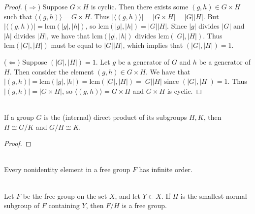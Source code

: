 \documentclass{article}
\begin{document}
\begin{proof}
    ($\Rightarrow$) Suppose $G \times H$ is cyclic. Then there exists some $(g, h) \in G \times H$ such that $\langle (g, h) \rangle = G \times H$. Thus $|\langle (g, h) \rangle| = |G \times H| = |G||H|$. But $|\langle (g, h) \rangle| = \mathrm{lcm}(|g|, |h|)$, so $\mathrm{lcm}(|g|, |h|) = |G||H|$. Since $|g|$ divides $|G|$ and $|h|$ divides $|H|$, we have that $\mathrm{lcm}(|g|, |h|)$ divides $\mathrm{lcm}(|G|, |H|)$. Thus $\mathrm{lcm}(|G|, |H|)$ must be equal to $|G||H|$, which implies that $(|G|, |H|) = 1$.

    ($\Leftarrow$) Suppose $(|G|, |H|) = 1$. Let $g$ be a generator of $G$ and $h$ be a generator of $H$. Then consider the element $(g, h) \in G \times H$. We have that $|(g, h)| = \mathrm{lcm}(|g|, |h|) = \mathrm{lcm}(|G|, |H|) = |G||H|$ since $(|G|, |H|) = 1$. Thus $|(g, h)| = |G \times H|$, so $\langle (g, h) \rangle = G \times H$ and $G \times H$ is cyclic.
\end{proof}



\begin{problem}[1.8.9] \\ 
    If a group $G$ is the (internal) direct product of its subgroups $H, K$, then $H \cong G/K$ and $G/H \cong K$.
\end{problem}


\begin{proof}
    
\end{proof}




\begin{problem}[1.9.1] \\ 
    Every nonidentity element in a free group $F$ has infinite order.
\end{problem}




\begin{problem}[1.9.4] \\ 
    Let $F$ be the free group on the set $X$, and let $Y \subset X$. If $H$ is the smallest normal subgroup of $F$ containing $Y$, then $F/H$ is a free group.
\end{problem}
\end{document}
